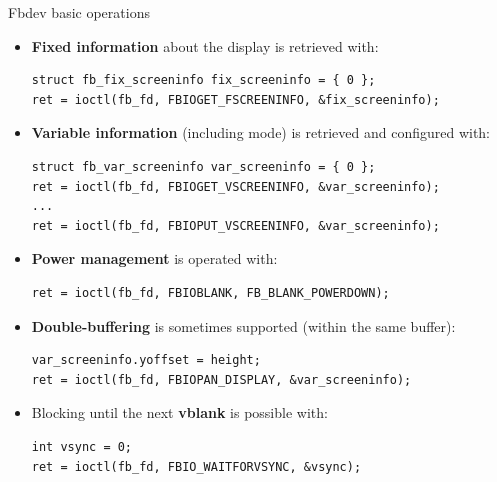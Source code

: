 \begin{frame}[fragile]{Fbdev basic operations}
  \begin{itemize}
  \item \textbf{Fixed information} about the display is retrieved with:
  \begin{verbatim}
struct fb_fix_screeninfo fix_screeninfo = { 0 };
ret = ioctl(fb_fd, FBIOGET_FSCREENINFO, &fix_screeninfo);
  \end{verbatim}
  \item \textbf{Variable information} (including mode) is retrieved and configured with:
  \begin{verbatim}
struct fb_var_screeninfo var_screeninfo = { 0 };
ret = ioctl(fb_fd, FBIOGET_VSCREENINFO, &var_screeninfo);
...
ret = ioctl(fb_fd, FBIOPUT_VSCREENINFO, &var_screeninfo);
  \end{verbatim}
  \item \textbf{Power management} is operated with:
  \begin{verbatim}
ret = ioctl(fb_fd, FBIOBLANK, FB_BLANK_POWERDOWN);
  \end{verbatim}
  \item \textbf{Double-buffering} is sometimes supported (within the same buffer):
  \begin{verbatim}
var_screeninfo.yoffset = height;
ret = ioctl(fb_fd, FBIOPAN_DISPLAY, &var_screeninfo);
  \end{verbatim}
  \item Blocking until the next \textbf{vblank} is possible with:
  \begin{verbatim}
int vsync = 0;
ret = ioctl(fb_fd, FBIO_WAITFORVSYNC, &vsync);
  \end{verbatim}
  \end{itemize}
\end{frame}

